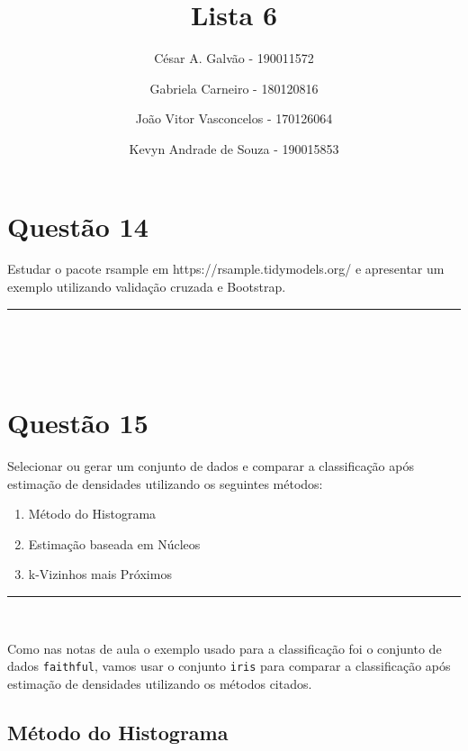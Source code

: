 \documentclass[
  a4paperpaper,
]{article}
\title{Lista 6}
\author{César A. Galvão - 190011572 \and Gabriela Carneiro -
180120816 \and João Vitor Vasconcelos - 170126064 \and Kevyn Andrade de
Souza - 190015853}
\date{}
\providecommand{\tightlist}{%
  \setlength{\itemsep}{0pt}\setlength{\parskip}{0pt}}\usepackage{longtable,booktabs,array}
\renewcommand*\contentsname{Índice}
\newcommand\contentsname{Índice}
\begin{document}
\maketitle

\renewcommand*\contentsname{Índice}
{
\hypersetup{linkcolor=}
\setcounter{tocdepth}{2}
\tableofcontents
}
\newpage{}

\section{Questão 14}\label{questuxe3o-14}

Estudar o pacote rsample em https://rsample.tidymodels.org/ e apresentar
um exemplo utilizando validação cruzada e Bootstrap.

\begin{center}\rule{0.5\linewidth}{0.5pt}\end{center}

~

~

\section{Questão 15}\label{questuxe3o-15}

Selecionar ou gerar um conjunto de dados e comparar a classificação após
estimação de densidades utilizando os seguintes métodos:

\begin{enumerate}
\def\labelenumi{\arabic{enumi}.}
\tightlist
\item
  Método do Histograma
\item
  Estimação baseada em Núcleos
\item
  k-Vizinhos mais Próximos
\end{enumerate}

\begin{center}\rule{0.5\linewidth}{0.5pt}\end{center}

~

Como nas notas de aula o exemplo usado para a classificação foi o
conjunto de dados \texttt{faithful}, vamos usar o conjunto \texttt{iris}
para comparar a classificação após estimação de densidades utilizando os
métodos citados.

\subsection{Método do Histograma}\label{muxe9todo-do-histograma}
\end{document}
